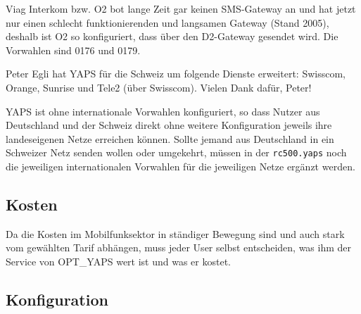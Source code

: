 Viag Interkom bzw. O2 bot lange Zeit gar keinen SMS-Gateway an und hat jetzt
nur einen schlecht funktionierenden und langsamen Gateway (Stand 2005), deshalb
ist O2 so konfiguriert, dass über den D2-Gateway gesendet wird. Die Vorwahlen
sind 0176 und 0179.

Peter Egli hat YAPS für die Schweiz um folgende Dienste erweitert: Swisscom,
Orange, Sunrise und Tele2 (über Swisscom). Vielen Dank dafür, Peter!

YAPS ist ohne internationale Vorwahlen konfiguriert, so dass Nutzer aus
Deutschland und der Schweiz direkt ohne weitere Konfiguration jeweils ihre
landeseigenen Netze erreichen können. Sollte jemand aus Deutschland in ein
Schweizer Netz senden wollen oder umgekehrt, müssen in der \texttt{rc500.yaps}
noch die jeweiligen internationalen Vorwahlen für die jeweiligen Netze ergänzt
werden.

\subsection {Kosten}

Da die Kosten im Mobilfunksektor in ständiger Bewegung sind und auch stark vom
gewählten Tarif abhängen, muss jeder User selbst entscheiden, was ihm der Service
von OPT\_YAPS wert ist und was er kostet.



\subsection {Konfiguration}

